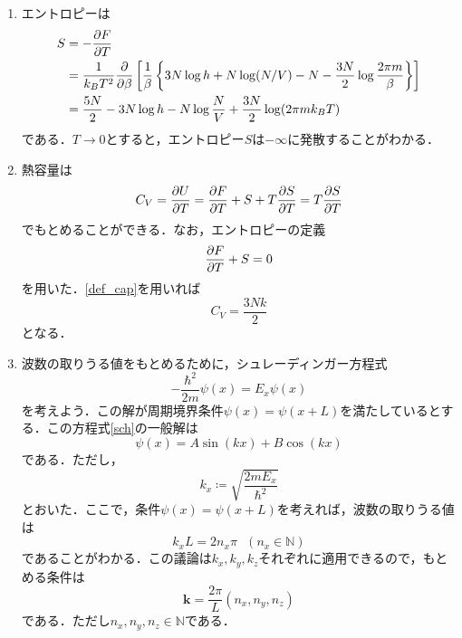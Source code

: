 \documentclass[a4paper,pdflatex,ja=standard]{bxjsarticle}
\begin{document}
\begin{enumerate}
  \item 
  エントロピーは
  \begin{align}
    S
    &=
    -\pdv{F}{T}
    \nonumber
    \\
    &=
    \frac{1}{k_B T^2}\pdv{}{\beta}\left[ \frac{1}{\beta}\left\{ 3 N\log h
    +
    N\log (N/V)
    -
    N
    -
    \frac{3N}{2}\log \frac{2\pi m}{\beta} \right\} \right]
    \nonumber
    \\
    &=
    \frac{5N}{2}
    -3N\log h
    -N\log \frac{N}{V}
    +\frac{3N}{2}\log(2\pi mk_{B}T)
  \end{align}
  である．$T\rightarrow 0$とすると，エントロピー$S$は$-\infty$に発散することがわかる．

  \item 
  熱容量は
  \begin{equation}
    C_{V}
    =
    \pdv{U}{T}
    =
    \pdv{F}{T}
    +
    S
    +
    T\pdv{S}{T}
    =
    T\pdv{S}{T}
    \label{def_cap}
  \end{equation}
  でもとめることができる．なお，エントロピーの定義
  \begin{equation}
    \pdv{F}{T}
    +
    S
    =
    0
  \end{equation}
  を用いた．\eqref{def_cap}を用いれば
  \begin{equation}
    C_{V}
    =
    \frac{3Nk}{2}
  \end{equation}
  となる．

  \item 
  波数の取りうる値をもとめるために，シュレーディンガー方程式
  \begin{equation}
    -\frac{\hbar^2}{2m}\psi(x)
    =
    E_{x}\psi(x)
    \label{sch}
  \end{equation}
  を考えよう．この解が周期境界条件$\psi(x)=\psi(x+L)$を満たしているとする．この方程式\eqref{sch}の一般解は
  \begin{equation}
    \psi(x)
    =
    A\sin(kx)+B\cos(kx)
  \end{equation}
  である．ただし，
  \begin{equation}
    k_{x}
    \coloneqq
    \sqrt{\frac{2mE_{x}}{\hbar^2}}
  \end{equation}
  とおいた．ここで，条件$\psi(x)=\psi(x+L)$を考えれば，波数の取りうる値は
  \begin{equation}
    k_{x}L=2n_{x}\pi
    \ \ \ 
    (n_{x}\in\mathbb{N})
  \end{equation}
  であることがわかる．この議論は$k_{x},k_{y},k_{z}$それぞれに適用できるので，もとめる条件は
  \begin{equation}
    \bm{k}
    =
    \frac{2\pi}{L}(n_{x},n_{y},n_{z})
  \end{equation}
  である．ただし$n_{x},n_{y},n_{z}\in\mathbb{N}$である．


\end{enumerate}
\end{document}

